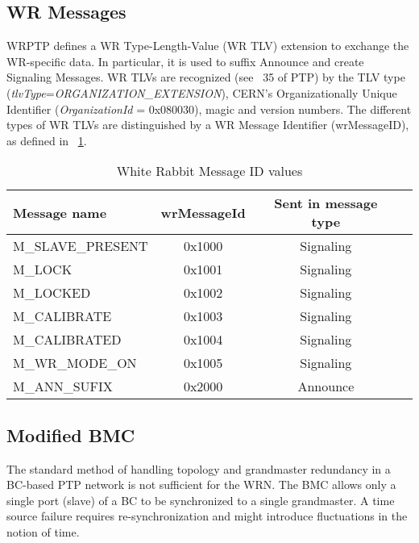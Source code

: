 \subsection{WR Messages}
\label{sec:wrMessages}

WRPTP defines a WR Type-Length-Value (WR TLV) extension to exchange the WR-specific data.
In particular, it is used to suffix Announce and create Signaling Messages. 
WR TLVs are recognized (see \tablename~35 of PTP) by the TLV type
(\textit{tlvType}=\textit{ORGANIZATION\_EXTENSION}), CERN's Organizationally Unique Identifier 
(\textit{OrganizationId} = 0x080030), magic and version numbers. The different types of WR
TLVs are distinguished by a WR Message Identifier (wrMessageID), as defined in
\tablename~\ref{tab:wrMessageId}.

\begin{table}[!t]
\caption{White Rabbit Message ID values}
\centering
\begin{tabular}{| l | c| c | c |}          \hline
\textbf{Message name}  &  \textbf{wrMessageId} &  \textbf{Sent in message type} \\   \hline
M\_SLAVE\_PRESENT     &  0x1000 & Signaling \\ \hline
M\_LOCK               &  0x1001 & Signaling \\ \hline
M\_LOCKED             &  0x1002 & Signaling \\ \hline
M\_CALIBRATE          &  0x1003 & Signaling \\ \hline
M\_CALIBRATED         &  0x1004 & Signaling \\ \hline
M\_WR\_MODE\_ON       &  0x1005 & Signaling \\ \hline
M\_ANN\_SUFIX	      &  0x2000 & Announce  \\ \hline
\end{tabular}
\label{tab:wrMessageId}
\end{table}


\subsection{Modified BMC}
\label{sec:wrBMC}
The standard method of handling topology and grandmaster redundancy in a BC-based PTP network 
is not sufficient for the WRN. The BMC allows only a single port (slave) of a BC to 
be synchronized to a single grandmaster. A time source failure requires re-synchronization and might
introduce fluctuations in the notion of time.

